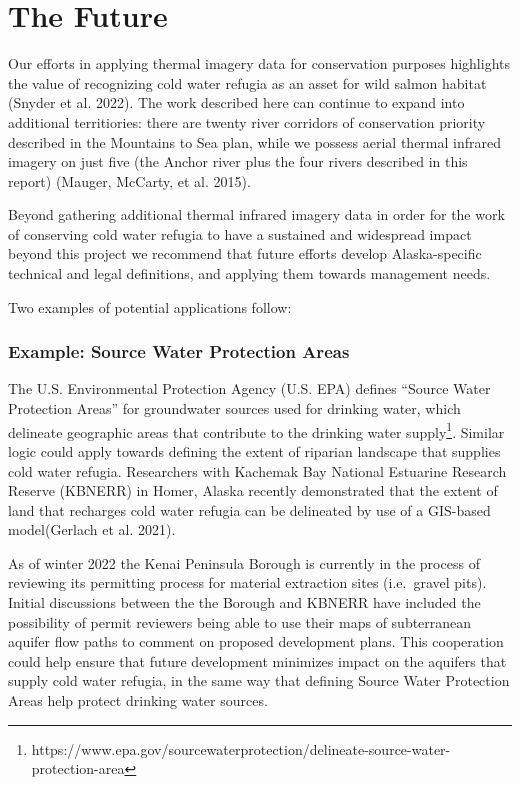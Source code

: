 \documentclass[
  letterpaper,
  DIV=11,
  numbers=noendperiod]{scrreprt}
\begin{document}
\hypertarget{the-future}{%
\section*{The Future}\label{the-future}}


Our efforts in applying thermal imagery data for conservation purposes
highlights the value of recognizing cold water refugia as an asset for
wild salmon habitat (Snyder et al. 2022). The work described here can
continue to expand into additional territiories: there are twenty river
corridors of conservation priority described in the Mountains to Sea
plan, while we possess aerial thermal infrared imagery on just five (the
Anchor river plus the four rivers described in this report) (Mauger,
McCarty, et al. 2015).

Beyond gathering additional thermal infrared imagery data in order for
the work of conserving cold water refugia to have a sustained and
widespread impact beyond this project we recommend that future efforts
develop Alaska-specific technical and legal definitions, and applying
them towards management needs.

Two examples of potential applications follow:

\hypertarget{example-source-water-protection-areas}{%
\subsubsection*{Example: Source Water Protection
Areas}\label{example-source-water-protection-areas}}

The U.S. Environmental Protection Agency (U.S. EPA) defines ``Source
Water Protection Areas'' for groundwater sources used for drinking
water, which delineate geographic areas that contribute to the drinking
water supply\footnote{https://www.epa.gov/sourcewaterprotection/delineate-source-water-protection-area}.
Similar logic could apply towards defining the extent of riparian
landscape that supplies cold water refugia. Researchers with Kachemak
Bay National Estuarine Research Reserve (KBNERR) in Homer, Alaska
recently demonstrated that the extent of land that recharges cold water
refugia can be delineated by use of a GIS-based model(Gerlach et al.
2021).

As of winter 2022 the Kenai Peninsula Borough is currently in the
process of reviewing its permitting process for material extraction
sites (i.e.~gravel pits). Initial discussions between the the Borough
and KBNERR have included the possibility of permit reviewers being able
to use their maps of subterranean aquifer flow paths to comment on
proposed development plans. This cooperation could help ensure that
future development minimizes impact on the aquifers that supply cold
water refugia, in the same way that defining Source Water Protection
Areas help protect drinking water sources.
\end{document}
